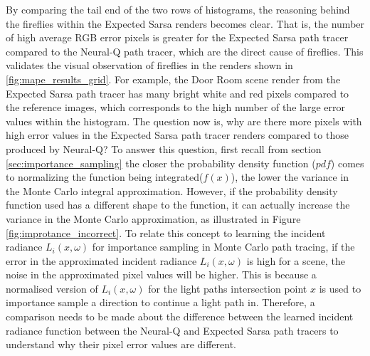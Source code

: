 \documentclass[../dissertation.tex]{subfiles}
\begin{document}
By comparing the tail end of the two rows of histograms, the reasoning behind the fireflies within the Expected Sarsa renders becomes clear. That is, the number of high average RGB error pixels is greater for the Expected Sarsa path tracer compared to the Neural-Q path tracer, which are the direct cause of fireflies. This validates the visual observation of fireflies in the renders shown in \ref{fig:mape_results_grid}. For example, the Door Room scene render from the Expected Sarsa path tracer has many bright white and red pixels compared to the reference images, which corresponds to the high number of the large error values within the histogram. The question now is, why are there more pixels with high error values in the Expected Sarsa path tracer renders compared to those produced by Neural-Q? To answer this question, first recall from section \ref{sec:importance_sampling} the closer the probability density function ($pdf$) comes to normalizing the function being integrated($f(x)$), the lower the variance in the Monte Carlo integral approximation. However, if the probability density function used has a different shape to the function, it can actually increase the variance in the Monte Carlo approximation, as illustrated in Figure \ref{fig:improtance_incorrect}. To relate this concept to learning the incident radiance $L_i(x, \omega)$ for importance sampling in Monte Carlo path tracing, if the error in the approximated incident radiance $L_i(x, \omega)$ is high for a scene, the noise in the approximated pixel values will be higher. This is because a normalised version of $L_i(x, \omega)$ for the light paths intersection point $x$ is used to importance sample a direction to continue a light path in. Therefore, a comparison needs to be made about the difference between the learned incident radiance function between the Neural-Q and Expected Sarsa path tracers to understand why their pixel error values are different.
\end{document}
